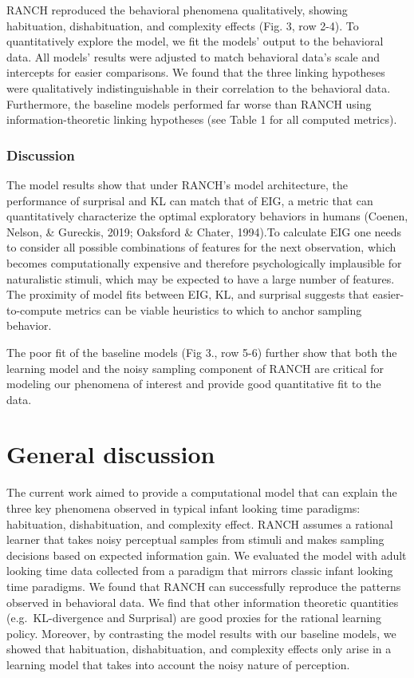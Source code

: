 \documentclass[10pt, letterpaper]{article}
\begin{document}
RANCH reproduced the behavioral phenomena qualitatively, showing
habituation, dishabituation, and complexity effects (Fig. 3, row 2-4).
To quantitatively explore the model, we fit the models' output to the
behavioral data. All models' results were adjusted to match behavioral
data's scale and intercepts for easier comparisons. We found that the
three linking hypotheses were qualitatively indistinguishable in their
correlation to the behavioral data. Furthermore, the baseline models
performed far worse than RANCH using information-theoretic linking
hypotheses (see Table 1 for all computed metrics).

\hypertarget{discussion}{%
\subsubsection{Discussion}\label{discussion}}

The model results show that under RANCH's model architecture, the
performance of surprisal and KL can match that of EIG, a metric that can
quantitatively characterize the optimal exploratory behaviors in humans
(Coenen, Nelson, \& Gureckis, 2019; Oaksford \& Chater, 1994).To
calculate EIG one needs to consider all possible combinations of
features for the next observation, which becomes computationally
expensive and therefore psychologically implausible for naturalistic
stimuli, which may be expected to have a large number of features. The
proximity of model fits between EIG, KL, and surprisal suggests that
easier-to-compute metrics can be viable heuristics to which to anchor
sampling behavior.

The poor fit of the baseline models (Fig 3., row 5-6) further show that
both the learning model and the noisy sampling component of RANCH are
critical for modeling our phenomena of interest and provide good
quantitative fit to the data.

\hypertarget{general-discussion}{%
\section{General discussion}\label{general-discussion}}

The current work aimed to provide a computational model that can explain
the three key phenomena observed in typical infant looking time
paradigms: habituation, dishabituation, and complexity effect. RANCH
assumes a rational learner that takes noisy perceptual samples from
stimuli and makes sampling decisions based on expected information gain.
We evaluated the model with adult looking time data collected from a
paradigm that mirrors classic infant looking time paradigms. We found
that RANCH can successfully reproduce the patterns observed in
behavioral data. We find that other information theoretic quantities
(e.g.~KL-divergence and Surprisal) are good proxies for the rational
learning policy. Moreover, by contrasting the model results with our
baseline models, we showed that habituation, dishabituation, and
complexity effects only arise in a learning model that takes into
account the noisy nature of perception.
\end{document}
